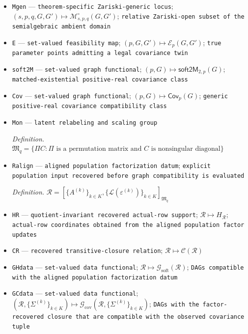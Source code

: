 \documentclass{article}
\begin{document}
\begin{itemize}
  \item \texttt{Mgen} --- \texttt{theorem-\allowbreak{}specific Zariski-\allowbreak{}generic locus}; \((s,p,q,G,G')\mapsto\mathcal M^{\circ}_{s,p,q}(G,G')\); \texttt{relative Zariski-\allowbreak{}open subset of the semialgebraic ambient domain}
  \item \texttt{E} --- \texttt{set-\allowbreak{}valued feasibility map}; \((p,G,G')\mapsto\mathcal E_p(G,G')\); \texttt{true parameter points admitting a legal covariance twin}
  \item \texttt{soft2M} --- \texttt{set-\allowbreak{}valued graph functional}; \((p,G)\mapsto\mathsf{soft2M}_{2,p}(G)\); \texttt{matched-\allowbreak{}existential positive-\allowbreak{}real covariance class}
  \item \texttt{Cov} --- \texttt{set-\allowbreak{}valued graph functional}; \((p,G)\mapsto\mathsf{Cov}_p(G)\); \texttt{generic positive-\allowbreak{}real covariance compatibility class}
  \item \texttt{Mon} --- \texttt{latent relabeling and scaling group}
  \par\smallskip\noindent\emph{Definition.} \(\mathfrak M_q=\{\Pi C:\Pi\text{ is a permutation matrix and }C\text{ is nonsingular diagonal}\}\)
  \item \texttt{Ralign} --- \texttt{aligned population factorization datum}; \texttt{explicit population input recovered before graph compatibility is evaluated}
  \par\smallskip\noindent\emph{Definition.} \(\mathcal R=[\{A^{(k)}\}_{k\in K},\{\mathcal L(\varepsilon^{(k)})\}_{k\in K}]_{\mathfrak M_q}\)
  \item \texttt{HR} --- \texttt{quotient-\allowbreak{}invariant recovered actual-\allowbreak{}row support}; \(\mathcal R\mapsto H_{\mathcal R}\); \texttt{actual-\allowbreak{}row coordinates obtained from the aligned population factor updates}
  \item \texttt{CR} --- \texttt{recovered transitive-\allowbreak{}closure relation}; \(\mathcal R\mapsto\mathcal C(\mathcal R)\)
  \item \texttt{GHdata} --- \texttt{set-\allowbreak{}valued data functional}; \(\mathcal R\mapsto\mathcal G_{\mathrm{soft}}(\mathcal R)\); \texttt{DAGs compatible with the aligned population factorization datum}
  \item \texttt{GCdata} --- \texttt{set-\allowbreak{}valued data functional}; \((\mathcal R,\{\Sigma^{(k)}\}_{k\in K})\mapsto\mathcal G_{\mathrm{cov}}(\mathcal R,\{\Sigma^{(k)}\}_{k\in K})\); \texttt{DAGs with the factor-\allowbreak{}recovered closure that are compatible with the observed covariance tuple}

\end{itemize}
\end{document}
